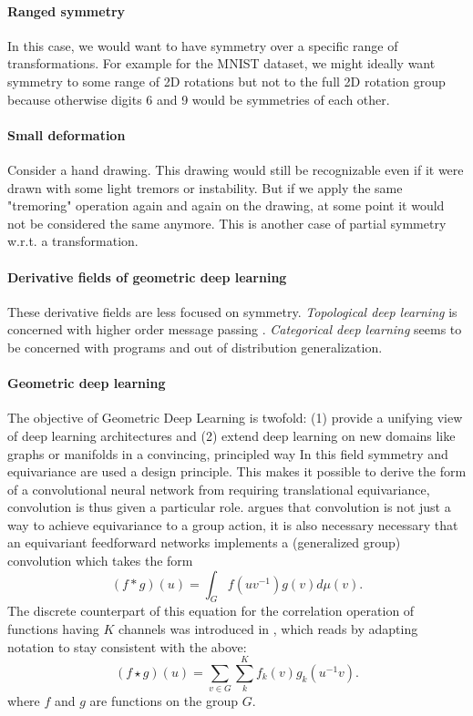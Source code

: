 \paragraph{Ranged symmetry} In this case, we would want to have symmetry over a specific range of transformations. For example for the MNIST dataset, we might ideally want symmetry to  some range of 2D rotations but not to the full 2D rotation group because otherwise digits 6 and 9 would be symmetries of each other. 

\paragraph{Small deformation} Consider a hand drawing. This drawing would still be recognizable even if it were drawn with some light tremors or instability. But if we apply the same "tremoring" operation again and again on the drawing, at some point it would not be considered the same anymore. This is another case of partial symmetry w.r.t. a transformation.

\myline

\paragraph{Derivative fields of geometric deep learning}
These derivative fields are less focused on symmetry.
\textit{Topological deep learning} is concerned with higher order message passing \cite{papillon2023,papamarkou2024}.
\textit{Categorical deep learning} seems to be concerned with programs and out of distribution generalization.

\myline

\paragraph{Geometric deep learning}
The objective of Geometric Deep Learning \cite{bronstein2017ispm, bronstein2021} is twofold: (1) provide a unifying view of deep learning architectures and (2) extend deep learning on new domains like graphs or manifolds in a convincing, principled way
In this field symmetry and equivariance are used a design principle.
This makes it possible to derive the form of a convolutional neural network from requiring translational equivariance, convolution is thus given a particular role.
\cite{kondor2018p3icml} argues that convolution is not just a way to achieve equivariance to a group action, it is also necessary necessary that an equivariant feedforward networks implements a (generalized group) convolution which takes the form 
\[
    (f\ast g)(u)=\int_Gf(uv^{-1})g(v)d\mu(v).
\]
The discrete counterpart of this equation for the correlation operation of functions having $K$ channels was introduced in \cite{cohen2016}, which reads by adapting notation to stay consistent with the above:
\[
    (f\star g)(u)=\sum_{v \in G}\sum_k^Kf_k(v)g_k(u^{-1}v).
\]
where $f$ and $g$ are functions on the group $G$.

